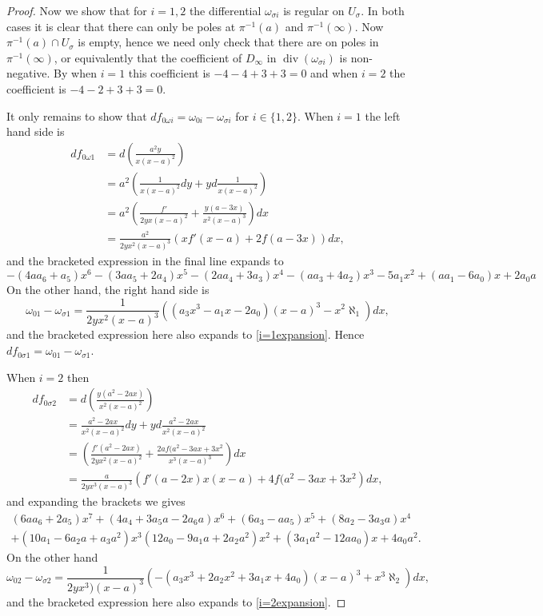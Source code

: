 \documentclass[draft, 11pt]{article} %
\theoremstyle{plain}
\theoremstyle{remark}
\DeclareMathOperator{\di}{div}
\begin{document}
\begin{proof}
Now we show that for $i = 1, 2$ the differential $\omega_{\sigma i}$ is regular on $U_\sigma$.
In both cases it is clear that there can only be poles at $\pi^{-1}(a)$ and $\pi^{-1}(\infty)$.
Now $\pi^{-1}(a) \cap U_\sigma$ is empty, hence we need only check that there are on poles in $\pi^{-1}(\infty)$, or equivalently that the coefficient of $D_\infty$ in $\di( \omega_{\sigma i})$ is non-negative.
By  when $i=1$ this coefficient is $-4 - 4 + 3 + 3 = 0$ and when $i=2$ the coefficient is $-4 -2 +3 + 3=0$.

It only remains to show that $df_{0 \omega i} = \omega_{0 i} - \omega_{\sigma i}$ for $i \in \{ 1, 2\}$.
When $i=1$ the left hand side is 
\begin{align*}
df_{0 \omega 1} & = d \left( \frac{a^2y}{x(x-a)^2} \right)  \\
& = a^2\left( \frac{1}{x(x-a)^2}dy + y d \frac{1}{x(x-a)^2} \right) \\
 & = a^2 \left( \frac{f'}{2yx(x-a)^2} + \frac{y(a-3x)}{x^2(x-a)^3} \right) dx \\
& = \frac{a^2}{2yx^2(x-a)^3} \left( xf'(x-a) + 2f(a-3x) \right) dx,
\end{align*}
and the bracketed expression in the final line expands to 
\begin{equation}\label{i=1expansion}
-(4aa_6+a_5)x^6-(3aa_5+2a_4)x^5-(2aa_4+3a_3)x^4-(aa_3+4a_2)x^3-5a_1x^2+(aa_1-6a_0)x+2a_0a
\end{equation}
On the other hand, the right hand side is
\begin{equation*}
\omega_{0 1} - \omega_{\sigma 1}  = \frac{1}{2yx^2(x-a)^3} \left( (a_3x^3 -a_1x-2a_0)(x-a)^3 - x^2\aleph_1\right )dx,
\end{equation*}
and the bracketed expression here also expands to \eqref{i=1expansion}.
Hence $df_{0 \sigma 1} = \omega_{0 1} - \omega_{\sigma 1}$.

When $i=2$ then 
\begin{align*}
df_{0 \sigma 2} & = d \left( \frac{y(a^2 -2ax)}{x^2(x-a)^2} \right) \\
& = \frac{a^2-2ax}{x^2(x-a)^2} dy + y d \frac{a^2-2ax}{x^2(x-a)^2} \\
& = \left( \frac{f'(a^2-2ax)}{2yx^2(x-a)^2} + \frac{2af(a^2-3ax+3x^2}{x^3(x-a)^3} \right) dx \\
& = \frac{a}{2yx^3(x-a)^3} \left( f'(a-2x)x(x-a) + 4f(a^2-3ax+3x^2 \right) dx,
\end{align*}
and expanding the brackets we gives
\begin{multline}\label{i=2expansion}
(6aa_6+2a_5)x^7+(4a_4+3a_5a-2a_6a)x^6+(6a_3-aa_5)x^5+(8a_2-3a_3a)x^4 \\ + (10a_1 -6a_2a+a_3a^2)x^3 
(12a_0-9a_1a+2a_2a^2)x^2 + (3a_1a^2-12aa_0)x + 4a_0a^2.
\end{multline}
On the other hand
\begin{equation*}
\omega_{0 2} - \omega_{\sigma 2} = \frac{1}{2yx^3)(x-a)^3}\left( -(a_3x^3+2a_2x^2+3a_1x+4a_0)(x-a)^3 + x^3\aleph_2 \right) dx,
\end{equation*}
and the bracketed expression here also expands to \eqref{i=2expansion}.
\end{proof}
\end{document}
